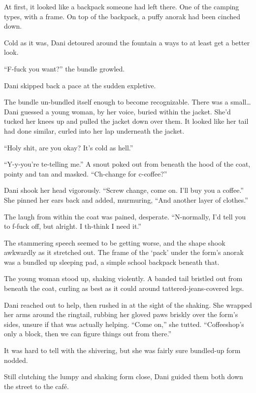 At first, it looked like a backpack someone had left there. One of the camping types, with a frame. On top of the backpack, a puffy anorak had been cinched down.

Cold as it was, Dani detoured around the fountain a ways to at least get a better look.

``F-fuck you want?'' the bundle growled.

Dani skipped back a pace at the sudden expletive.

The bundle un-bundled itself enough to become recognizable. There was a small\ldots{}Dani guessed a young woman, by her voice, buried within the jacket. She'd tucked her knees up and pulled the jacket down over them. It looked like her tail had done similar, curled into her lap underneath the jacket.

``Holy shit, are you okay? It's cold as hell.''

``Y-y-you're te-telling me.'' A snout poked out from beneath the hood of the coat, pointy and tan and masked. ``Ch-change for c-coffee?''

Dani shook her head vigorously. ``Screw change, come on. I'll buy you a coffee.'' She pinned her ears back and added, murmuring, ``And another layer of clothes.''

The laugh from within the coat was pained, desperate. ``N-normally, I'd tell you to f-fuck off, but alright. I th-think I need it.''

The stammering speech seemed to be getting worse, and the shape shook awkwardly as it stretched out. The frame of the `pack' under the form's anorak was a bundled up sleeping pad, a simple school backpack beneath that.

The young woman stood up, shaking violently. A banded tail bristled out from beneath the coat, curling as best as it could around tattered-jeans-covered legs.

Dani reached out to help, then rushed in at the sight of the shaking. She wrapped her arms around the ringtail, rubbing her gloved paws briskly over the form's sides, unsure if that was actually helping. ``Come on,'' she tutted. ``Coffeeshop's only a block, then we can figure things out from there.''

It was hard to tell with the shivering, but she was fairly sure bundled-up form nodded.

Still clutching the lumpy and shaking form close, Dani guided them both down the street to the café.

\secdiv

